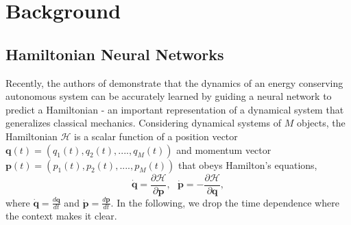 \documentclass{article}
\begin{document}
\section{Background}

\subsection{Hamiltonian Neural Networks}

Recently, the authors of \cite{greydanus_hamiltonian_2019} demonstrate that the dynamics of an energy conserving autonomous system can be accurately learned by guiding a neural network to predict a Hamiltonian - an important representation of a dynamical system that generalizes classical mechanics. Considering dynamical systems of $M$ objects, the Hamiltonian $\mathcal{H}$ is a scalar function of a position vector $\mathbf{q}(t) = (q_1(t),q_2(t),....,q_M(t))$ and momentum vector $\mathbf{p}(t) = (p_1(t),p_2(t),....,p_M(t))$ that obeys Hamilton's equations,
\begin{equation}
\dot{\mathbf{q}}= \frac{\partial \mathcal{H}}{\partial \mathbf{p}}, ~~~
\dot{\mathbf{p}}= -\frac{\partial \mathcal{H}}{\partial \mathbf{q}},
\label{eqn.hamiltonian}
\end{equation}
where $\dot{\mathbf{q}}=\frac{d\mathbf{q}}{dt}$ and  $\dot{\mathbf{p}}=\frac{d\mathbf{p}}{dt}$. In the following, we drop the time dependence where the context makes it clear.
\end{document}
